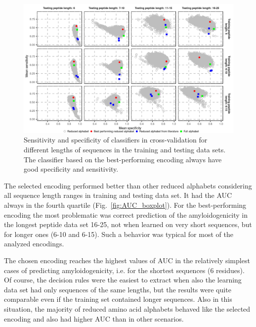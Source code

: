 \documentclass{bioinfo}
\begin{document}
\begin{figure}[!tpb]
\centerline{\includegraphics{figures/sesp_plot.png}}
\caption{Sensitivity and specificity of classifiers in cross-validation for 
different lengths of sequences in the training and testing data sets.
The classifier based on the best-performing encoding always have 
good specificity and sensitivity.}\label{fig:sesp_plot}
\end{figure}

The selected encoding performed better than other reduced alphabets considering 
all sequence length ranges in training and testing data set. It had the AUC 
%
%
%
always in the fourth quartile (Fig.~\ref{fig:AUC_boxplot}). For the 
best-performing encoding the most problematic was correct prediction of the 
amyloidogenicity in the longest peptide data set 16-25, not when learned on very 
short sequences, but for longer ones (6-10 and 6-15). Such a behavior was 
typical for most of the analyzed encodings.

  The chosen encoding reaches the highest values of AUC in the relatively 
simplest cases of predicting amyloidogenicity, i.e. for the shortest sequences (6 
%
%
%
residues). Of course, the decision rules were the easiest to extract when also 
the learning data set had only sequences of the same lengths, but the results 
were quite comparable even if the training set contained longer sequences. Also 
in this situation, the majority of reduced amino acid alphabets behaved like the 
selected encoding and also had higher AUC than in other scenarios.
%
%
%
\end{document}
